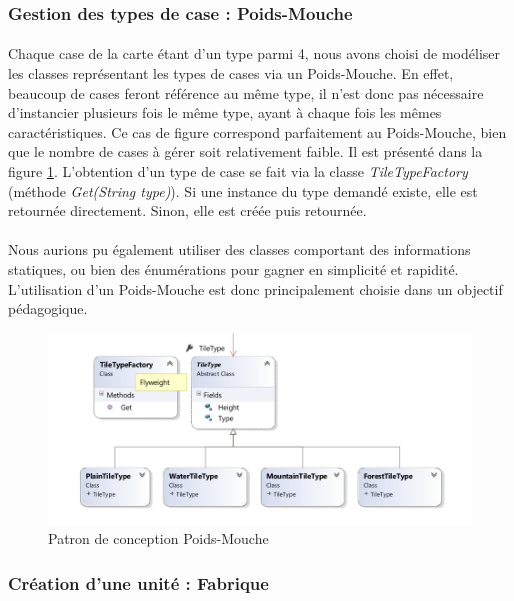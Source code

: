 \subsubsection{Gestion des types de case : Poids-Mouche}

\paragraph{}
Chaque case de la carte étant d'un type parmi 4, nous avons choisi de modéliser les classes représentant les types de cases via un Poids-Mouche.
En effet, beaucoup de cases feront référence au même type, il n'est donc pas nécessaire d'instancier plusieurs fois le même type, ayant à chaque fois les mêmes caractéristiques.
Ce cas de figure correspond parfaitement au Poids-Mouche, bien que le nombre de cases à gérer soit relativement faible. Il est présenté dans la figure \ref{fig:flyweight}.
L'obtention d'un type de case se fait via la classe \emph{TileTypeFactory} (méthode \emph{Get(String type)}). Si une instance du type demandé existe, elle est retournée directement.
Sinon, elle est créée puis retournée.

\paragraph{}
Nous aurions pu également utiliser des classes comportant des informations statiques, ou bien des énumérations pour gagner en simplicité et rapidité.
L'utilisation d'un Poids-Mouche est donc principalement choisie dans un objectif pédagogique.

\begin{figure}[h]
  \centering
  \includegraphics[width=13cm]{schemas/dp_flyweight.png}
  \caption{Patron de conception Poids-Mouche}
  \label{fig:flyweight}
\end{figure}

\subsubsection{Création d'une unité : Fabrique}

